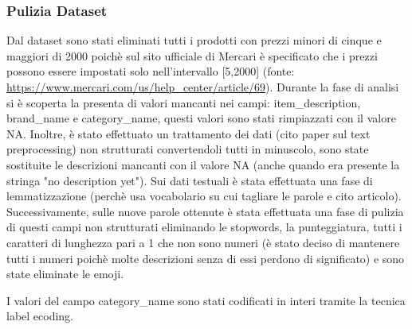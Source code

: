\subsubsection{Pulizia Dataset}
Dal dataset sono stati eliminati tutti i prodotti con prezzi minori di cinque e maggiori di 2000 poichè sul sito ufficiale di Mercari è specificato che i prezzi possono essere impostati solo nell'intervallo [5,2000] (fonte: \url{https://www.mercari.com/us/help_center/article/69}).
Durante la fase di analisi si è scoperta la presenta di valori mancanti nei campi: item\_description, brand\_name e category\_name, questi valori sono stati rimpiazzati con il valore NA.
Inoltre, è stato effettuato un trattamento dei dati (cito paper sul text preprocessing) non strutturati convertendoli tutti in minuscolo, sono state sostituite le descrizioni mancanti con il valore NA (anche quando era presente la stringa "no description yet").
Sui dati testuali è stata effettuata una fase di lemmatizzazione (perchè usa vocabolario su cui tagliare le parole e cito articolo). Successivamente, sulle nuove parole ottenute è stata effettuata una fase di pulizia di questi campi non strutturati eliminando le stopwords, la punteggiatura, tutti i caratteri di lunghezza pari a 1 che non sono numeri (è stato deciso di mantenere tutti i numeri poichè molte descrizioni senza di essi perdono di significato) e sono state eliminate le emoji.


I valori del campo category\_name sono stati codificati in interi tramite la tecnica label ecoding.



